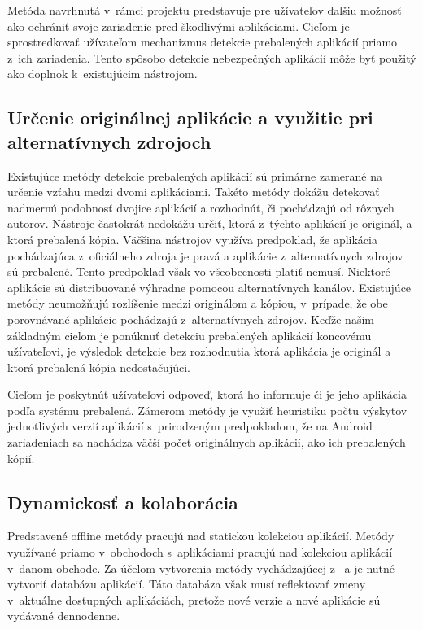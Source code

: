 Metóda navrhnutá v~rámci projektu  predstavuje pre užívateľov ďalšiu možnosť ako ochrániť svoje zariadenie pred škodlivými aplikáciami. Cieľom je sprostredkovať užívateľom mechanizmus detekcie prebalených aplikácií priamo z~ich zariadenia. Tento spôsobo detekcie nebezpečných aplikácií môže byť použitý ako doplnok k~existujúcim nástrojom.


\subsection*{Určenie originálnej aplikácie a využitie pri alternatívnych zdrojoch}

Existujúce metódy detekcie prebalených aplikácií sú primárne zamerané na určenie vzťahu medzi dvomi aplikáciami. Takéto metódy dokážu detekovať nadmernú podobnosť dvojice aplikácií a rozhodnúť, či pochádzajú od rôznych autorov. Nástroje častokrát nedokážu určiť, ktorá z~týchto aplikácií je originál, a ktorá prebalená kópia. Väčšina nástrojov využíva predpoklad, že aplikácia pochádzajúca z~oficiálneho zdroja  je pravá a aplikácie z~alternatívnych zdrojov sú prebalené. Tento predpoklad však vo všeobecnosti platiť nemusí. Niektoré aplikácie sú distribuované výhradne pomocou alternatívnych kanálov. Existujúce metódy neumožňujú rozlíšenie medzi originálom a kópiou, v~prípade, že obe porovnávané aplikácie pochádzajú z~alternatívnych zdrojov. Keďže našim základným cieľom je ponúknuť detekciu prebalených aplikácií koncovému užívateľovi, je výsledok detekcie bez rozhodnutia ktorá aplikácia je originál a ktorá prebalená kópia nedostačujúci. 


Cieľom je poskytnúť užívateľovi odpoveď, ktorá ho informuje či je jeho aplikácia podľa systému  prebalená. 
Zámerom metódy  je využiť heuristiku počtu výskytov jednotlivých verzií aplikácií s~prirodzeným predpokladom, že na Android zariadeniach sa nachádza väčší počet originálnych aplikácií, ako ich prebalených kópií. 

\subsection*{Dynamickosť a kolaborácia}
Predstavené offline metódy pracujú nad statickou kolekciou aplikácií. Metódy využívané priamo v~obchodoch s~aplikáciami pracujú nad kolekciou aplikácií v~danom obchode. Za účelom vytvorenia metódy vychádzajúcej z~ a  je nutné vytvoriť databázu aplikácií. Táto databáza však musí reflektovať zmeny v~aktuálne dostupných aplikáciách, pretože nové verzie a nové aplikácie sú vydávané dennodenne. 


